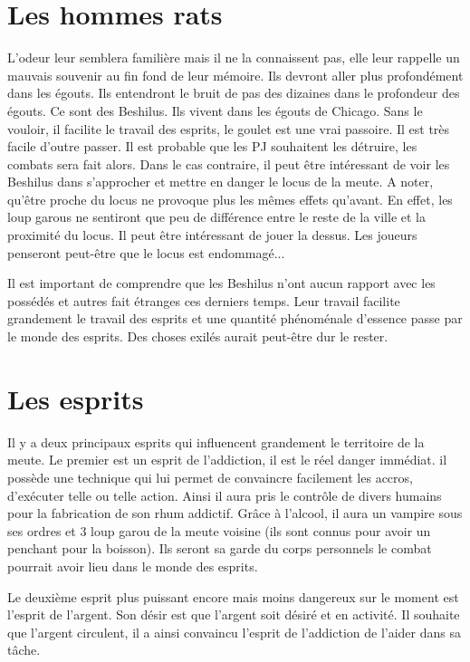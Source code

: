 \documentclass[oneside,12pt]{book}
\begin{document}
\begin{flushleft}
\section{Les hommes rats}
L'odeur leur semblera familière mais il ne la connaissent pas, elle leur rappelle un mauvais souvenir au fin fond de leur mémoire. 
Ils devront aller plus profondément dans les égouts.
Ils entendront le bruit de pas des dizaines dans le profondeur des égouts. Ce sont des Beshilus. Ils vivent dans les égouts de Chicago. Sans le vouloir, il facilite le travail des esprits, le goulet est une vrai passoire.
Il est très facile d'outre passer.
Il est probable que les PJ souhaitent les détruire, les combats sera fait alors. 
Dans le cas contraire, il peut être intéressant de voir les Beshilus dans s'approcher et mettre en danger le locus de la meute.
A noter, qu'être proche du locus ne provoque plus les mêmes effets qu'avant. En effet, les loup garous ne sentiront que peu de différence entre le reste de la ville et 
la proximité du locus. Il peut être intéressant de jouer la dessus. Les joueurs penseront peut-être que le locus est endommagé...

Il est important de comprendre que les Beshilus n'ont aucun rapport avec les possédés et autres fait étranges ces derniers temps. Leur travail facilite grandement le
travail des esprits et une quantité phénoménale d'essence passe par le monde des esprits. Des choses exilés aurait peut-être dur le rester.


\section{Les esprits}
Il y a deux principaux esprits qui influencent grandement le territoire de la meute. 
Le premier est un esprit de l'addiction, il est le réel danger immédiat.
il possède une technique qui lui permet de convaincre facilement les accros, d'exécuter telle ou telle action. 
Ainsi il aura pris le contrôle de divers humains pour la fabrication de son rhum addictif. 
Grâce à l'alcool, il aura un vampire sous ses ordres et 3 loup garou de la meute voisine (ils sont connus pour avoir un penchant pour la boisson). 
Ils seront sa garde du corps personnels le combat pourrait avoir lieu dans le monde des esprits. 

Le deuxième esprit plus puissant encore mais moins dangereux sur le moment est l'esprit de l'argent. Son désir est que l'argent soit désiré et en activité.
Il souhaite que l'argent circulent, il a ainsi convaincu l'esprit de l'addiction de l'aider dans sa tâche. 


\end{flushleft}
\end{document}
